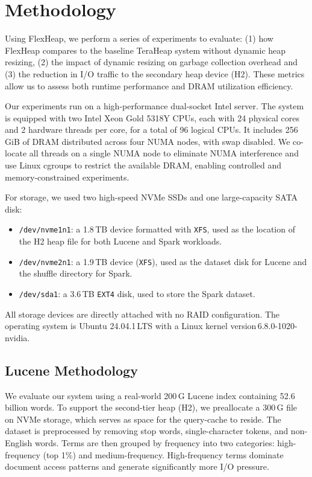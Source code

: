 \section{Methodology}

Using FlexHeap, we perform a series of experiments to evaluate: 
(1) how FlexHeap compares to the baseline TeraHeap system without dynamic heap resizing,
(2) the impact of dynamic resizing on garbage collection overhead and
(3) the reduction in I/O traffic to the secondary heap device (H2).
These metrics allow us to assess both runtime performance and DRAM utilization efficiency.

Our experiments run on a high-performance dual-socket Intel server.
The system is equipped with two Intel Xeon Gold 5318Y CPUs, each with 24 physical cores 
and 2 hardware threads per core, for a total of 96 logical CPUs. It includes 256\,GiB of DRAM 
distributed across four NUMA nodes, with swap disabled. We co-locate all threads on a single
NUMA node to eliminate NUMA interference and use Linux cgroups to restrict the available DRAM,
enabling controlled and memory-constrained experiments.

For storage, we used two high-speed NVMe SSDs and one large-capacity SATA disk:
\begin{itemize}
  \item \texttt{/dev/nvme1n1}: a 1.8\,TB device formatted with \texttt{XFS}, used as the location of 
                               the H2 heap file for both Lucene and Spark workloads.
  \item \texttt{/dev/nvme2n1}: a 1.9\,TB device (\texttt{XFS}), used as the dataset disk for Lucene 
                               and the shuffle directory for Spark.
  \item \texttt{/dev/sda1}: a 3.6\,TB \texttt{EXT4} disk, used to store the Spark dataset.
\end{itemize}

All storage devices are directly attached with no RAID configuration. The operating system is Ubuntu 
24.04.1\,LTS with a Linux kernel version\,6.8.0-1020-nvidia.
\subsection{Lucene Methodology}

We evaluate our system using a real-world 200\,G Lucene index containing 52.6 billion words. 
To support the second-tier heap (H2), we preallocate a 300\,G file on NVMe storage, which serves as space 
for the query-cache to reside.
The dataset is preprocessed by removing stop words, single-character tokens, and non-English words. 
Terms are then grouped by frequency into two categories: high-frequency (top 1\%) and medium-frequency. 
High-frequency terms dominate document access patterns and generate significantly more I/O pressure.


